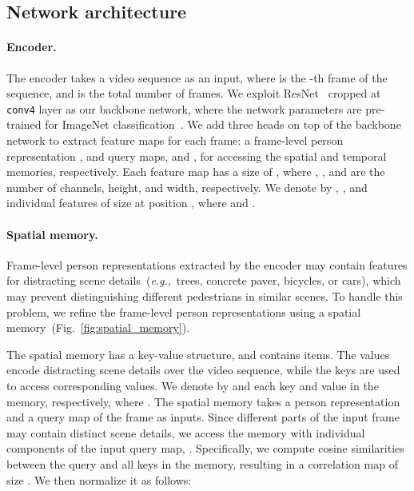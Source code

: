 \documentclass[10pt,twocolumn,letterpaper]{article}
\begin{document}
	\vspace{-0.2cm}
	\subsection{Network architecture} \label{subsec:network_architecture}
	
		\vspace{-0.1cm}
		\paragraph{Encoder.} \label{subsubsec:encoder}
		
			The encoder takes a video sequence  as an input, where  is the -th frame of the sequence, and  is the total number of frames. We exploit ResNet~\cite{he2016deep} cropped at \texttt{conv4} layer as our backbone network, where the network parameters are pre-trained for ImageNet classification~\cite{krizhevsky2012imagenet}. We add three heads on top of the backbone network to extract feature maps for each frame: a frame-level person representation , and query maps,  and , for accessing the spatial and temporal memories, respectively. Each feature map has a size of , where , , and  are the number of channels, height, and width, respectively. We denote by , , and  individual features of size  at position , where  and .

		\vspace{-0.4cm}
		\paragraph{Spatial memory.} \label{subsubsec:spatial_memory}
		
			Frame-level person representations extracted by the encoder may contain features for distracting scene details~(\emph{e.g.},~trees, concrete paver, bicycles, or cars), which may prevent distinguishing different pedestrians in similar scenes. To handle this problem, we refine the frame-level person representations  using a spatial memory~(Fig.~\ref{fig:spatial_memory}).
			
			The spatial memory has a key-value structure, and contains  items. The values   encode distracting scene details over the video sequence, while the keys  are used to access corresponding values. We denote by  and  each key and value in the memory, respectively, where . The spatial memory takes a person representation  and a query map  of the frame  as inputs. Since different parts of the input frame may contain distinct scene details, we access the memory with individual components of the input query map, . Specifically, we compute cosine similarities between the query  and all keys  in the memory, resulting in a correlation map of size . We then normalize it as follows:
					
\end{document}
